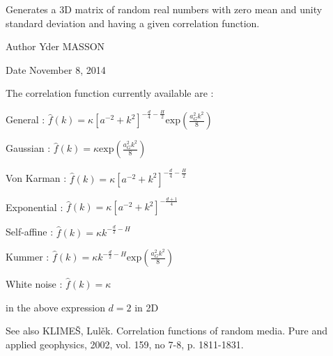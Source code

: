 \-Generates a 3\-D matrix of random real numbers with zero mean and unity standard deviation and having a given correlation function. 

\begin{DoxyAuthor}{\-Author}
\-Yder \-M\-A\-S\-S\-O\-N 
\end{DoxyAuthor}
\begin{DoxyDate}{\-Date}
\-November 8, 2014
\end{DoxyDate}
\-The correlation function currently available are \-: \par
 \par
 \par
 \-General \-: $ \hat{f}(k) = \kappa \left[ a^{-2}+k^2\right]^{-\frac{d}{4}-\frac{H}{2}} \mbox{exp}\left(\frac{a_G^2k^2}{8}\right)$ \par
 \par
 \-Gaussian \-: $ \hat{f}(k) = \kappa \mbox{exp}\left(\frac{a_G^2k^2}{8}\right)$ \par
 \par
 \-Von \-Karman \-: $ \hat{f}(k) = \kappa \left[ a^{-2}+k^2\right]^{-\frac{d}{4}-\frac{H}{2}}$ \par
 \par
 \-Exponential \-: $ \hat{f}(k) = \kappa \left[ a^{-2}+k^2\right]^{-\frac{d+1}{4}}$ \par
 \par
 \-Self-\/affine \-: $ \hat{f}(k) = \kappa k^{-\frac{d}{2}-H}$ \par
 \par
 \-Kummer \-: $ \hat{f}(k) = \kappa k^{-\frac{d}{2}-H} \mbox{exp}\left(\frac{a_G^2k^2}{8}\right)$ \par
 \par
 \-White noise \-: $ \hat{f}(k) = \kappa $ \par
 \par
 in the above expression $ d = 2$ in 2\-D

\begin{DoxySeeAlso}{\-See also}
\-K\-L\-I\-M\-EŠ, \-Lulěk. \-Correlation functions of random media. \-Pure and applied geophysics, 2002, vol. 159, no 7-\/8, p. 1811-\/1831. 
\end{DoxySeeAlso}


